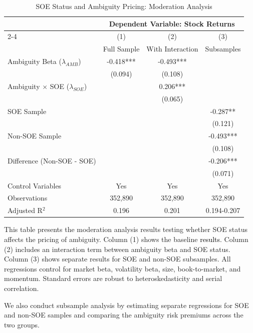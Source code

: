 \documentclass[preprint,12pt,authoryear]{elsarticle}
\begin{document}
\begin{table}[htbp]
\centering
\caption{SOE Status and Ambiguity Pricing: Moderation Analysis}
\label{tab:soe_moderation}
\begin{threeparttable}
\begin{tabular*}{\textwidth}{@{\extracolsep{\fill}} lccc @{\extracolsep{\fill}}}
\toprule
& \multicolumn{3}{c}{Dependent Variable: Stock Returns} \\
\cmidrule(lr){2-4}
& (1) & (2) & (3) \\
& Full Sample & With Interaction & Subsamples \\
\midrule
\midrule
Ambiguity Beta ($\lambda_{AMB}$) & -0.418*** & -0.493*** &  \\
& (0.094) & (0.108) &  \\
\midrule
Ambiguity $\times$ SOE ($\lambda_{SOE}$) & & 0.206*** &  \\
& & (0.065) &  \\
\midrule
SOE Sample & & & -0.287** \\
& & & (0.121) \\
\midrule
Non-SOE Sample & & & -0.493*** \\
& & & (0.108) \\
\midrule
Difference (Non-SOE - SOE) & & & -0.206*** \\
& & & (0.071) \\
\midrule
Control Variables & Yes & Yes & Yes \\
\midrule
Observations & 352,890 & 352,890 & 352,890 \\
Adjusted R$^2$ & 0.196 & 0.201 & 0.194-0.207 \\
\bottomrule
\end{tabular*}
\begin{tablenotes}[flushleft]
\small
\item[] This table presents the moderation analysis results testing whether SOE status affects the pricing of ambiguity. Column (1) shows the baseline \textcolor{black}{results}. Column (2) includes an interaction term between ambiguity beta and SOE status. Column (3) shows separate results for SOE and non-SOE subsamples. All regressions control for market beta, volatility beta, size, book-to-market, and momentum. Standard errors are robust to heteroskedasticity and serial correlation.
\end{tablenotes}
\end{threeparttable}
\end{table}

We also conduct subsample analysis by estimating separate regressions for SOE and non-SOE samples and comparing the ambiguity risk premiums across the two groups.
 
\end{document}
